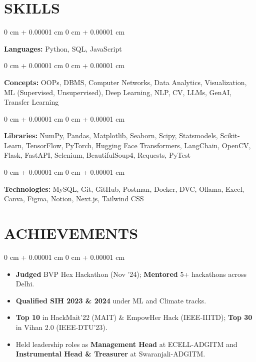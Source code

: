 \documentclass[10pt, letterpaper]{article}
\newenvironment{highlights}{
    \begin{itemize}[
        topsep=0.10 cm,
        parsep=0.10 cm,
        partopsep=0pt,
        itemsep=0pt,
        leftmargin=0 cm + 10pt
    ]
}{
    \end{itemize}
} %
\newenvironment{onecolentry}{
    \begin{adjustwidth}{
        0 cm + 0.00001 cm
    }{
        0 cm + 0.00001 cm
    }
}{
    \end{adjustwidth}
} %
\begin{document}
    
    \section{SKILLS}

        \begin{onecolentry}
            \textbf{Languages:} Python, SQL, JavaScript
        \end{onecolentry}

        \vspace{0.1 cm}

        \begin{onecolentry}
            \textbf{Concepts:} OOPs, DBMS, Computer Networks, Data Analytics, Visualization, ML (Supervised, Unsupervised), Deep Learning, NLP, CV, LLMs, GenAI, Transfer Learning
        \end{onecolentry}

        \vspace{0.1 cm}

        \begin{onecolentry}
            \textbf{Libraries:} NumPy, Pandas, Matplotlib, Seaborn, Scipy, Statsmodels, Scikit-Learn, TensorFlow, PyTorch, Hugging Face Transformers, LangChain, OpenCV, Flask, FastAPI, Selenium, BeautifulSoup4, Requests, PyTest
        \end{onecolentry}

        \vspace{0.1 cm}

        \begin{onecolentry}
            \textbf{Technologies:} MySQL, Git, GitHub, Postman, Docker, DVC, Ollama, Excel, Canva, Figma, Notion, Next.js, Tailwind CSS
        \end{onecolentry}



    \section{ACHIEVEMENTS}

        \begin{onecolentry}
            \begin{highlights}
                \item \textbf{Judged} BVP Hex Hackathon (Nov '24); \textbf{Mentored} 5+ hackathons across Delhi.
                \item \textbf{Qualified SIH 2023 \& 2024} under ML and Climate tracks.
                \item \textbf{Top 10} in HackMait’22 (MAIT) \& EmpowHer Hack (IEEE-IIITD); \textbf{Top 30} in Vihan 2.0 (IEEE-DTU’23).
                \item Held leadership roles as \textbf{Management Head} at ECELL-ADGITM and \textbf{Instrumental Head \& Treasurer} at Swaranjali-ADGITM.
            \end{highlights}
        \end{onecolentry}
\end{document}
